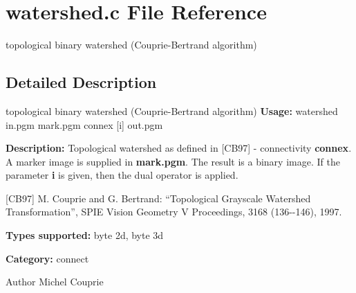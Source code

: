 \section{watershed.c File Reference}
\label{watershed_8c}


topological binary watershed (Couprie-\/Bertrand algorithm)  




\subsection{Detailed Description}
topological binary watershed (Couprie-\/Bertrand algorithm) {\bfseries Usage:} watershed in.pgm mark.pgm connex [i] out.pgm

{\bfseries Description:} Topological watershed as defined in [CB97] -\/ connectivity {\bfseries connex}. A marker image is supplied in {\bfseries mark.pgm}. The result is a binary image. If the parameter {\bfseries i} is given, then the dual operator is applied.

[CB97] M. Couprie and G. Bertrand: ``Topological Grayscale Watershed Transformation'', SPIE Vision Geometry V Proceedings, 3168 (136-\/-\/146), 1997.

{\bfseries Types supported:} byte 2d, byte 3d

{\bfseries Category:} connect

\begin{DoxyAuthor}{Author}
Michel Couprie 
\end{DoxyAuthor}
